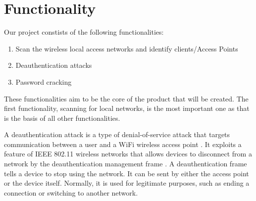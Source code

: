 \section{Functionality}
Our project constists of the following functionalities:
\begin{enumerate}
    \item Scan the wireless local access  networks and identify clients/Access Points
    \item Deauthentication attacks
    \item Password cracking
\end{enumerate}

These functionalities aim to be the core of the product that will be created. The first functionality, scanning for local networks, is the most important one as that is the basis of all other functionalities.

A deauthentication attack is a type of denial-of-service attack that targets communication between a user and a WiFi wireless access point \cite{Deauth}. It exploits a feature of IEEE 802.11 wireless networks that allows devices to disconnect from a network by the deauthentication management frame \cite{Deauth_Wiki}.
A deauthentication frame tells a device to stop using the network. It can be sent by either the access point or the device itself. Normally, it is used for legitimate purposes, such as ending a connection or switching to another network.

